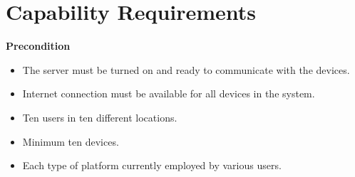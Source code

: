 \section{Capability Requirements}
\textbf{Precondition}
\begin{itemize}
\item The server must be turned on and ready to communicate with the devices.
\item Internet connection must be available for all devices in the system.
\item Ten users in ten different locations.
\item Minimum ten devices. 
\item Each type of platform currently employed by various users. \\
\end{itemize}


